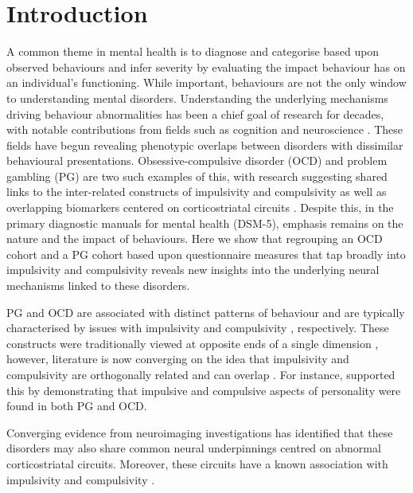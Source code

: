 \section{Introduction}

A common theme in mental health is to diagnose and categorise based upon observed behaviours and infer severity by evaluating the impact behaviour has on an individual's functioning. While important, behaviours are not the only window to understanding mental disorders. Understanding the underlying mechanisms driving behaviour abnormalities has been a chief goal of research for decades, with notable contributions from fields such as cognition and neuroscience \cite{Frank_2015}. These fields have begun revealing phenotypic overlaps between disorders with dissimilar behavioural presentations. Obsessive-compulsive disorder (OCD) and problem gambling (PG) are two such examples of this, with research suggesting shared links to the inter-related constructs of impulsivity and compulsivity \cite{Tavares_2007} as well as overlapping biomarkers centered on corticostriatal circuits \cite{van_Holst_2010,Harrison_2009,Harrison_2013}. Despite this, in the primary diagnostic manuals for mental health (DSM-5), emphasis remains on the nature and the impact of behaviours. Here we show that regrouping an OCD cohort and a PG cohort based upon questionnaire measures that tap broadly into impulsivity and compulsivity reveals new insights into the underlying neural mechanisms linked to these disorders.


PG and OCD are associated with distinct patterns of behaviour and are typically characterised by issues with impulsivity \cite{Goudriaan_2004} and compulsivity \cite{Stein_1994}, respectively. These constructs were traditionally viewed at opposite ends of a single dimension \cite{Fineberg_2009}, however, literature is now converging on the idea that impulsivity and compulsivity are orthogonally related and can overlap \cite{Fineberg_2009,Fontenelle_2011}. For instance, \citet{Tavares_2007} supported this by demonstrating that impulsive and compulsive aspects of personality were found in both PG and OCD.


Converging evidence from neuroimaging investigations has identified that these disorders may also share common neural underpinnings centred on abnormal corticostriatal circuits. Moreover, these circuits have a known association with impulsivity and compulsivity \cite{Torregrossa2008}.





